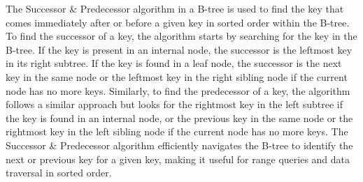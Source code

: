 The Successor \& Predecessor algorithm in a B-tree is used to find the key that comes immediately after or before a given key in sorted order within the B-tree. To find the successor of a key, the 
algorithm starts by searching for the key in the B-tree. If the key is present in an internal node, the successor is the leftmost key in its right subtree. If the key is found in a leaf node, the 
successor is the next key in the same node or the leftmost key in the right sibling node if the current node has no more keys. Similarly, to find the predecessor of a key, the algorithm follows a 
similar approach but looks for the rightmost key in the left subtree if the key is found in an internal node, or the previous key in the same node or the rightmost key in the left sibling node if 
the current node has no more keys. The Successor \& Predecessor algorithm efficiently navigates the B-tree to identify the next or previous key for a given key, making it useful for range queries 
and data traversal in sorted order.

